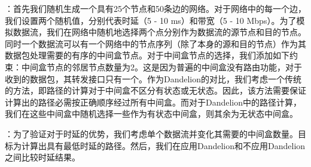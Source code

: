 
：首先我们随机生成一个具有25个节点和50条边的网络。对于网络中的每一个边，我们设置两个随机值，分别代表时延（5 - 10 ms）和带宽（5 - 10 Mbps）。为了模拟数据流，我们在网络中随机地选择两个点分别作为数据流的源节点和目的节点。同时一个数据流可以有一个网络中的节点序列（除了本身的源和目的节点）作为其数据包处理需要的有序的中间盒节点。对于中间盒节点的选择，我们添加如下约束：中间盒节点的邻居节点数量为2。这是因为普遍的中间盒没有路由功能，对于收到的数据包，其转发接口只有一个。作为Dandelion的对比，我们考虑一个传统的方法，即路径的计算对于中间盒不区分有状态或无状态。因此，该方法需要保证计算出的路径必需按正确顺序经过所有中间盒。而对于Dandelion中的路径计算，我们在这些中间盒中随机选择一些作为有状态中间盒，则其余为无状态中间盒。


：为了验证对于时延的优势，我们考虑单个数据流并变化其需要的中间盒数量。目标为计算出具有最低时延的路径。然后，我们在应用Dandelion和不应用Dandelion之间比较时延结果。


